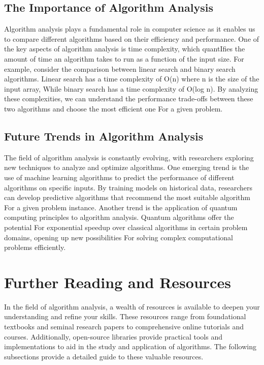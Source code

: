 \documentclass[12pt]{book} %
\begin{document}
\subsection{The Importance of Algorithm Analysis}
Algorithm analysis plays a fundamental role in computer science as it enables us to compare different algorithms based on their efficiency and performance. One of the key aspects of algorithm analysis is time complexity, which quantIfies the amount of time an algorithm takes to run as a function of the input size. For example, consider the comparison between linear search and binary search algorithms. Linear search has a time complexity of O(n) where n is the size of the input array, While binary search has a time complexity of O(log n). By analyzing these complexities, we can understand the performance trade-offs between these two algorithms and choose the most efficient one For a given problem.

\subsection{Future Trends in Algorithm Analysis}
The field of algorithm analysis is constantly evolving, with researchers exploring new techniques to analyze and optimize algorithms. One emerging trend is the use of machine learning algorithms to predict the performance of different algorithms on specific inputs. By training models on historical data, researchers can develop predictive algorithms that recommend the most suitable algorithm For a given problem instance. Another trend is the application of quantum computing principles to algorithm analysis. Quantum algorithms offer the potential For exponential speedup over classical algorithms in certain problem domains, opening up new possibilities For solving complex computational problems efficiently.


\section{Further Reading and Resources}
In the field of algorithm analysis, a wealth of resources is available to deepen your understanding and refine your skills. These resources range from foundational textbooks and seminal research papers to comprehensive online tutorials and courses. Additionally, open-source libraries provide practical tools and implementations to aid in the study and application of algorithms. The following subsections provide a detailed guide to these valuable resources.
\end{document}
